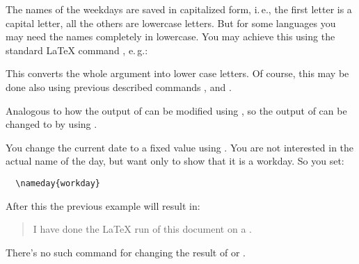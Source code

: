 \begin{Explain}
  The names of the weekdays are saved in capitalized form,
  i.\,e., the first letter is a capital letter, all the others are lowercase
  letters. But for some languages you may need the names completely in
  lowercase. You may achieve this using the standard {\LaTeX} command
  , e.\,g.:
\begin{lstcode}[belowskip=\dp\strutbox]
  \MakeLowercase{\todaysname}
\end{lstcode}
  This converts the whole argument into lower case letters. Of course, this
  may be done also using previous described commands
  ,
   and
  .%
\end{Explain}%
%
%
%


\begin{Declaration}
\end{Declaration}%
%
Analogous to how the output of  can be modified using
, so the output of  can
be changed to  by using .
\begin{Example}
  You change the current date to a fixed value using . You
  are not interested in the actual name of the day, but want only to
  show that it is a workday. So you set:
\begin{lstlisting}
  \nameday{workday}
\end{lstlisting}
  After this the previous example will result in:
  \begin{quote}
    I have done the {\LaTeX} run of this document on a \todaysname.
  \end{quote}
\end{Example}
There's no such command for changing the result of
 or .


